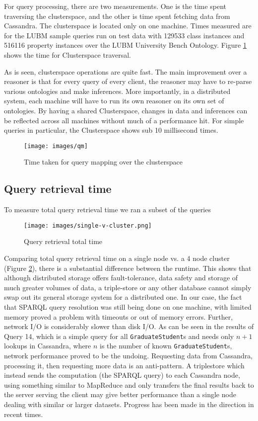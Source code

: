 \documentclass[journal]{IEEEtran}
\begin{document}
For query processing, there are two measurements. One is the time spent
traversing the clusterspace, and the other is time spent fetching data from
Cassandra. The clusterspace is located only on one machine. Times measured are
for the LUBM sample queries run on test data with 129533 class instances and
516116 property instances over the LUBM University Bench Ontology. Figure
\ref{fig:eval:qcs} shows the time for Clusterspace traversal.

As is seen, clusterspace operations are quite fast. The main improvement over
a reasoner is that for every query of every client, the reasoner may have to
re-parse various ontologies and make inferences. More importantly, in
a distributed system, each machine will have to run its own reasoner on its own
set of ontologies. By having a shared Clusterspace, changes in data and
inferences can be reflected across all machines without much of a performance
hit. For simple queries in particular, the Clusterspace shows sub 10
millisecond times.

\begin{figure}[h]
    \centering
    \texttt{[image: images/qm]}
    \caption{Time taken for query mapping over the clusterspace}
    \label{fig:eval:qcs}
\end{figure}

\subsection{Query retrieval time}

To measure total query retrieval time we ran a subset of the queries

\begin{figure}[t]
    \centering
    \texttt{[image: images/single-v-cluster.png]}
    \caption{Query retrieval total time}
    \label{fig:eval:qtotal}
\end{figure}

Comparing total query retrieval time on a single node vs. a 4 node cluster
(Figure \ref{fig:eval:qtotal}), there is a substantial difference between the
runtime. This shows that although distributed storage offers fault-tolerance,
data safety and storage of much greater volumes of data, a triple-store or any
other database cannot simply swap out its general storage system for
a distributed one. In our case, the fact that SPARQL query resolution was still
being done on one machine, with limited memory proved a problem with timeouts
or out of memory errors. Further, network I/O is considerably slower than disk
I/O. As can be seen in the results of Query 14, which is a simple query for all
\texttt{GraduateStudent}s and needs only $n+1$ lookups in Cassandra, where $n$
is the number of known \texttt{GraduateStudent}s, network performance proved to
be the undoing.  Requesting data from Cassandra, processing it, then requesting
more data is an anti-pattern. A triplestore which instead sends the computation
(the SPARQL query) to each Cassandra node, using something similar to MapReduce
and only transfers the final results back to the server serving the client may
give better performance than a single node dealing with similar or larger
datasets. Progress has been made in the direction in recent
times\cite{myung10spa}\cite{hus09hadoop}.
\end{document}
